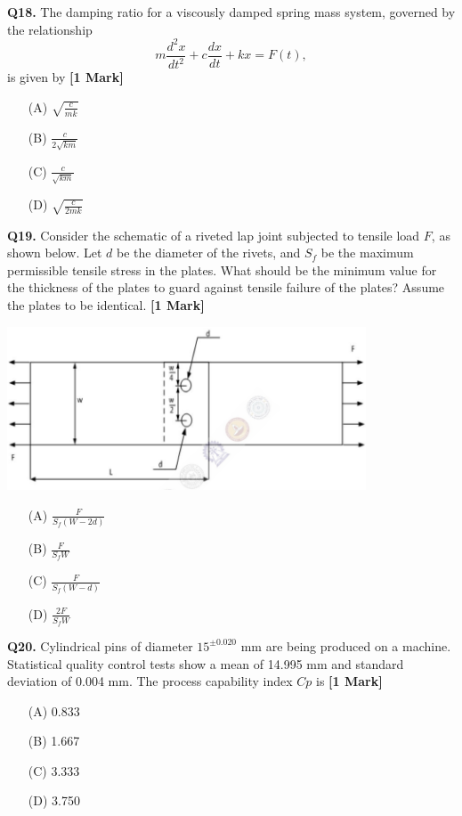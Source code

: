 \documentclass[11pt]{article}
\newcommand{\questiona}[2]{
    \noindent\textbf{Q#2.} #1 \hfill \textbf{[1 Mark]}
}
\begin{document}
\questiona{The damping ratio for a viscously damped spring mass system, governed by the relationship  
\[m \frac{d^2 x}{dt^2} + c \frac{dx}{dt} + kx = F(t),\]  
is given by}{18}
\begin{enumerate}
    \item[(A)] \(\sqrt{\frac{c}{mk}}\)  
    \item[(B)] \(\frac{c}{2\sqrt{km}}\)  
    \item[(C)] \(\frac{c}{\sqrt{km}}\)  
    \item[(D)] \(\sqrt{\frac{c}{2mk}}\)
\end{enumerate}
\vspace{0.5cm}

\questiona{Consider the schematic of a riveted lap joint subjected to tensile load \( F \), as shown below. Let \( d \) be the diameter of the rivets, and \( S_f \) be the maximum permissible tensile stress in the plates. What should be the minimum value for the thickness of the plates to guard against tensile failure of the plates? Assume the plates to be identical.}{19}
\begin{center}
\includegraphics[width=0.8\textwidth]{figures/19.png}
\end{center}
\begin{enumerate}
    \item[(A)] \( \frac{F}{S_f (W - 2d)} \)  
    \item[(B)] \( \frac{F}{S_f W} \)  
    \item[(C)] \( \frac{F}{S_f (W - d)} \)  
    \item[(D)] \( \frac{2F}{S_f W} \)
\end{enumerate}
\vspace{0.5cm}

\questiona{Cylindrical pins of diameter \( 15^{\pm 0.020} \) mm are being produced on a machine. Statistical quality control tests show a mean of 14.995 mm and standard deviation of 0.004 mm. The process capability index \( Cp \) is}{20}
\begin{enumerate}
    \item[(A)] 0.833  
    \item[(B)] 1.667  
    \item[(C)] 3.333  
    \item[(D)] 3.750
\end{enumerate}
\vspace{0.5cm}
\end{document}

